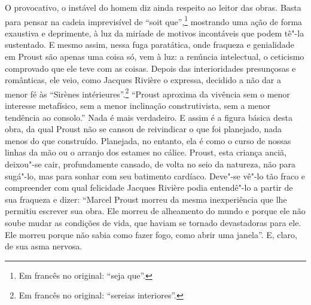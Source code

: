 O provocativo, o instável do homem diz ainda respeito ao leitor das
obras. Basta para pensar na cadeia imprevisível de ``soit
que'',\footnote{Em francês no original: ``seja que''. \versal{[N.~T.]}} mostrando uma ação de forma
exaustiva e deprimente, à luz da miríade de motivos incontáveis que
podem tê"-la sustentado. E mesmo assim, nessa fuga paratática, onde
fraqueza e genialidade em Proust são apenas uma coisa só, vem à luz: a
renúncia intelectual, o ceticismo comprovado que ele teve com as coisas.
Depois das interioridades presunçosas e românticas, ele veio, como
Jacques Rivière o expressa, decidido a não dar a menor fé às ``Sirènes
intérieures''.\footnote{Em francês no original: ``sereias interiores''. \versal{[N.~T.]}} ``Proust aproxima
da vivência sem o menor interesse metafísico, sem a menor inclinação
construtivista, sem a menor tendência ao consolo.'' Nada é mais
verdadeiro. E assim é a figura básica desta obra, da qual Proust não se
cansou de reivindicar o que foi planejado, nada menos do que construído.
Planejada, no entanto, ela é como o curso de nossas linhas da mão ou o
arranjo dos estames no cálice. Proust, esta criança anciã, deixou"-se
cair, profundamente cansado, de volta no seio da natureza, não para
sugá"-lo, mas para sonhar com seu batimento cardíaco. Deve"-se vê"-lo tão
fraco e compreender com qual felicidade Jacques Rivière podia entendê"-lo
a partir de sua fraqueza e dizer: ``Marcel Proust morreu da mesma
inexperiência que lhe permitiu escrever sua obra. Ele morreu de
alheamento do mundo e porque ele não soube mudar as condições de vida,
que haviam se tornado devastadoras para ele. Ele morreu porque não sabia
como fazer fogo, como abrir uma janela''. E, claro, de sua asma nervosa.

